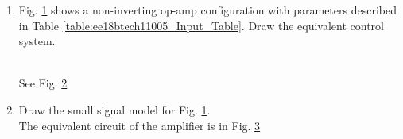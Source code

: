 \begin{enumerate}[label=\thesubsection.\arabic*.,ref=\thesubsection.\theenumi]

\item Fig. \ref{fig:ee18btech11005_original_circuit} shows a  non-inverting op-amp configuration   with parameters described in Table \ref{table:ee18btech11005_Input_Table}.  Draw the equivalent control system.
\renewcommand{\thefigure}{\theenumi.\arabic{figure}}
%
\begin{figure}[!ht]
	\begin{center}
		
		\resizebox{\columnwidth}{!}{}
	\end{center}
\caption{}
\label{fig:ee18btech11005_original_circuit}
\end{figure}
%
\begin{table}[!ht]
\centering

\caption{}
\label{table:ee18btech11005_Input_Table}
\end{table}
\\
\solution  See 	Fig. \ref{fig:ee18btech11005_equivalent_control_system}
\begin{figure}[!ht]
	\begin{center}
			\resizebox{\columnwidth}{!}{}
	\end{center}
\caption{}
\label{fig:ee18btech11005_equivalent_control_system}
\end{figure}
\renewcommand{\thefigure}{\theenumi}

\item Draw the small signal model for Fig. \ref{fig:ee18btech11005_original_circuit}.
\\
\solution
The equivalent circuit of the amplifier is in Fig. \ref{fig:ee18btech11005_equivalent_circuit}
\begin{figure}[!ht]
	\begin{center}
		
		\resizebox{\columnwidth}{!}{}
	\end{center}
\caption{}
\label{fig:ee18btech11005_equivalent_circuit}
\end{figure}


\end{enumerate}

